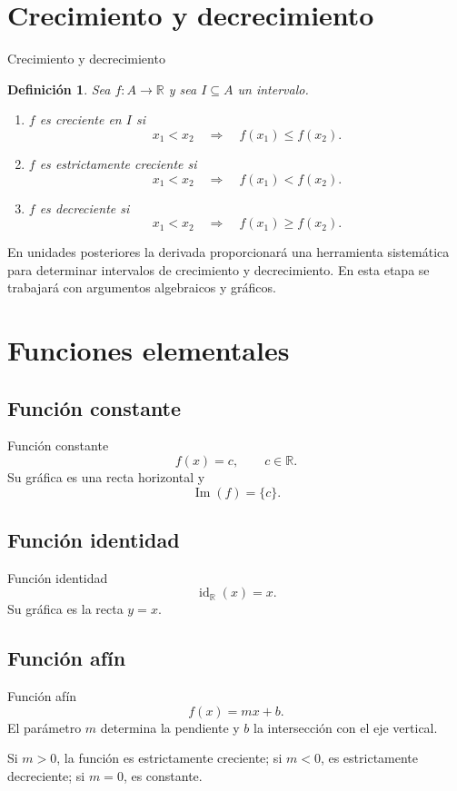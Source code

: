 \documentclass[aspectratio=169,10pt]{beamer}
\newtheorem{definicion}{Definición}
\newcommand{\R}{\mathbb{R}}
\newcommand{\Ima}{\operatorname{Im}}
\newcommand{\id}{\operatorname{id}}
\begin{document}
\section{Crecimiento y decrecimiento}
\begin{frame}{Crecimiento y decrecimiento}
\begin{definicion}
Sea $f:A\to\R$ y sea $I\subseteq A$ un intervalo.

\begin{enumerate}
    \item $f$ es \emph{creciente} en $I$ si
    \[
    x_1<x_2\quad\Longrightarrow\quad f(x_1)\leq f(x_2).
    \]
    \item $f$ es \emph{estrictamente creciente} si
    \[
    x_1<x_2\quad\Longrightarrow\quad f(x_1)<f(x_2).
    \]
    \item $f$ es \emph{decreciente} si
    \[
    x_1<x_2\quad\Longrightarrow\quad f(x_1)\geq f(x_2).
    \]
\end{enumerate}
\end{definicion}

En unidades posteriores la derivada proporcionará una herramienta sistemática
para determinar intervalos de crecimiento y decrecimiento. En esta etapa se
trabajará con argumentos algebraicos y gráficos.

\end{frame}
\section{Funciones elementales}
\subsection*{Función constante}
\begin{frame}{Función constante}
\[
f(x)=c,\qquad c\in\R.
\]
Su gráfica es una recta horizontal y
\[
\Ima(f)=\{c\}.
\]
\end{frame}
\subsection*{Función identidad}
\begin{frame}{Función identidad}
\[
\id_{\R}(x)=x.
\]
Su gráfica es la recta $y=x$.
\end{frame}
\subsection*{Función afín}
\begin{frame}{Función afín}
\[
f(x)=mx+b.
\]
El parámetro $m$ determina la pendiente y $b$ la intersección con el eje
vertical.

Si $m>0$, la función es estrictamente creciente; si $m<0$, es estrictamente
decreciente; si $m=0$, es constante.
\end{frame}
\end{document}
